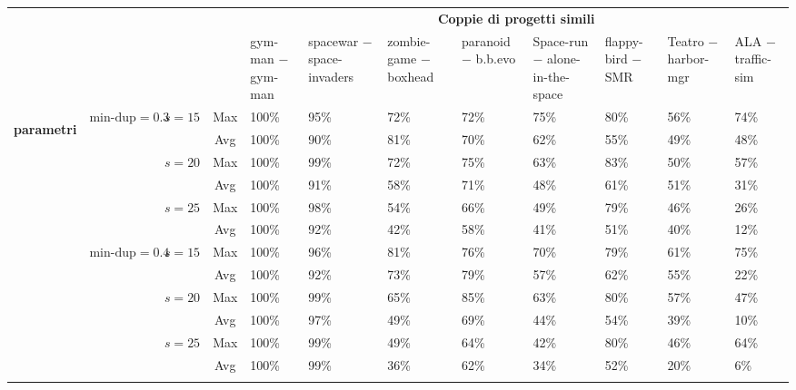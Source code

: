 \begin{landscape}
    \begin{table}[h!]
        \centering
        \begin{tabular}{ p{0.5cm}|c|c|c||p{1cm}|p{1.5cm}|p{1.5cm}|p{1.5cm}|p{1.5cm}|p{1.2cm}|p{1.2cm}|p{1.2cm} }
            \multicolumn{4}{c}{} & \multicolumn{8}{c}{\textbf{Coppie di progetti simili}} \\ [1ex]
            \multicolumn{4}{c|}{} & gym-man $-$ gym-man & spacewar $-$ space-invaders & zombie-game $-$ boxhead & paranoid $-$ b.b.evo & Space-run $-$ alone-in-the-space & flappy-bird $-$ SMR & Teatro $-$ harbor-mgr & ALA $-$ traffic-sim \\ [1ex]
            \hline\hline

            \multirow{18}{*}{\begin{turn}{90}\textbf{parametri}\end{turn}} & \multirow{6}{*}{$\text{min-dup}=0.3$} & \multirow{2}{*}{$s=15$} & Max & 100\% & 95\% & 72\% & 72\% & 75\% & 80\% & 56\% & 74\% \\
            & & & Avg & 100\% & 90\% & 81\% & 70\% & 62\% & 55\% & 49\% & 48\% \\
            & & \multirow{2}{*}{$s=20$} & Max & 100\% & 99\% & 72\% & 75\% & 63\% & 83\% & 50\% & 57\% \\
            & & & Avg & 100\% & 91\% & 58\% & 71\% & 48\% & 61\% & 51\% & 31\% \\
            & & \multirow{2}{*}{$s=25$} & Max & 100\% & 98\% & 54\% & 66\% & 49\% & 79\% & 46\% & 26\% \\
            & & & Avg & 100\% & 92\% & 42\% & 58\% & 41\% & 51\% & 40\% & 12\% \\
            \cline{2-12}

            & \multirow{6}{*}{$\text{min-dup}=0.4$} & \multirow{2}{*}{$s=15$} & Max & 100\% & 96\% & 81\% & 76\% & 70\% & 79\% & 61\% & 75\% \\
            & & & Avg & 100\% & 92\% & 73\% & 79\% & 57\% & 62\% & 55\% & 22\% \\
            & & \multirow{2}{*}{$s=20$} & Max & 100\% & 99\% & 65\% & 85\% & 63\% & 80\% & 57\% & 47\% \\
            & & & Avg & 100\% & 97\% & 49\% & 69\% & 44\% & 54\% & 39\% & 10\% \\
            & & \multirow{2}{*}{$s=25$} & Max & 100\% & 99\% & 49\% & 64\% & 42\% & 80\% & 46\% & 64\% \\
            & & & Avg & 100\% & 99\% & 36\% & 62\% & 34\% & 52\% & 20\% & 6\% \\
            \cline{2-12}


\end{tabular}
\end{table}
\end{landscape}
